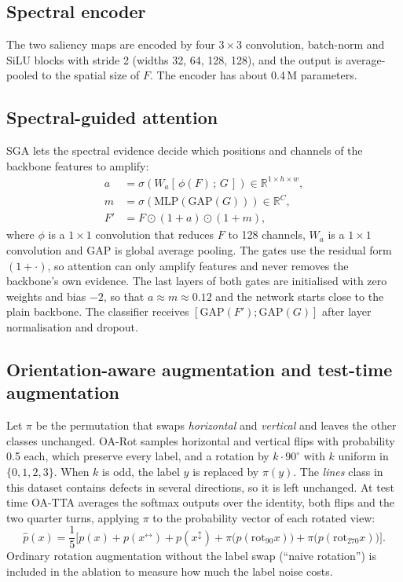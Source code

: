 \documentclass[preprint,12pt,authoryear]{elsarticle}
\begin{document}
\subsection{Spectral encoder}
The two saliency maps are encoded by four $3\times3$ convolution, batch-norm and SiLU blocks with
stride 2 (widths 32, 64, 128, 128), and the output is average-pooled to the spatial size of $F$.
The encoder has about 0.4\,M parameters.

\subsection{Spectral-guided attention}
SGA lets the spectral evidence decide which positions and channels of the backbone features to
amplify:
\begin{align}
a &= \sigma\!\left(W_a\left[\,\phi(F)\,;\,G\,\right]\right)\in\mathbb{R}^{1\times h\times w},\\
m &= \sigma\!\left(\mathrm{MLP}(\mathrm{GAP}(G))\right)\in\mathbb{R}^{C},\\
F' &= F\odot(1+a)\odot(1+m),
\end{align}
where $\phi$ is a $1\times1$ convolution that reduces $F$ to 128 channels, $W_a$ is a $1\times1$
convolution and GAP is global average pooling. The gates use the residual form $(1+\cdot)$, so
attention can only amplify features and never removes the backbone's own evidence. The last
layers of both gates are initialised with zero weights and bias $-2$, so that
$a\approx m\approx 0.12$ and the network starts close to the plain backbone. The classifier
receives $[\mathrm{GAP}(F');\mathrm{GAP}(G)]$ after layer normalisation and dropout.

\subsection{Orientation-aware augmentation and test-time augmentation}
Let $\pi$ be the permutation that swaps \emph{horizontal} and \emph{vertical} and leaves the other
classes unchanged. OA-Rot samples horizontal and vertical flips with probability 0.5 each, which
preserve every label, and a rotation by $k\cdot90^\circ$ with $k$ uniform in $\{0,1,2,3\}$. When $k$ is
odd, the label $y$ is replaced by $\pi(y)$. The \emph{lines} class in this dataset contains defects
in several directions, so it is left unchanged. At test time OA-TTA averages the softmax outputs
over the identity, both flips and the two quarter turns, applying $\pi$ to the probability vector of
each rotated view:
\begin{equation}
\hat p(x)=\frac15\Big[p(x)+p(x^{\leftrightarrow})+p(x^{\updownarrow})
+\pi\big(p(\mathrm{rot}_{90}x)\big)+\pi\big(p(\mathrm{rot}_{270}x)\big)\Big].
\end{equation}
Ordinary rotation augmentation without the label swap (``naive rotation'') is included in the
ablation to measure how much the label noise costs.
\end{document}
